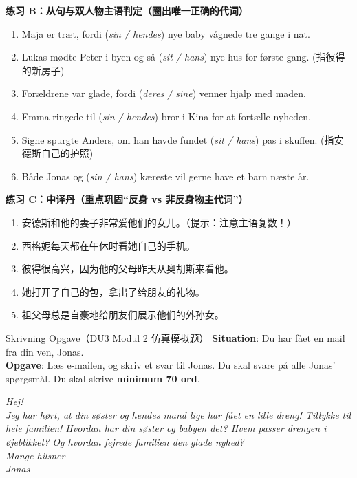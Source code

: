 \textbf{练习 B：从句与双人物主语判定（圈出唯一正确的代词）}
\begin{enumerate}
  \item Maja er træt, fordi (\textit{sin / hendes}) nye baby vågnede tre gange i nat.
  \item Lukas mødte Peter i byen og så (\textit{sit / hans}) nye hus for første gang. (指彼得的新房子)
  \item Forældrene var glade, fordi (\textit{deres / sine}) venner hjalp med maden.
  \item Emma ringede til (\textit{sin / hendes}) bror i Kina for at fortælle nyheden.
  \item Signe spurgte Anders, om han havde fundet (\textit{sit / hans}) pas i skuffen. (指安德斯自己的护照)
  \item Både Jonas og (\textit{sin / hans}) kæreste vil gerne have et barn næste år.
\end{enumerate}

\textbf{练习 C：中译丹（重点巩固“反身 vs 非反身物主代词”）}
\begin{enumerate}
  \item 安德斯和他的妻子非常爱他们的女儿。（提示：注意主语复数！）
  \item 西格妮每天都在午休时看她自己的手机。
  \item 彼得很高兴，因为他的父母昨天从奥胡斯来看他。
  \item 她打开了自己的包，拿出了给朋友的礼物。
  \item 祖父母总是自豪地给朋友们展示他们的外孙女。
\end{enumerate}


\begin{emailbox}{Skrivning Opgave（DU3 Modul 2 仿真模拟题）}
\textbf{Situation}: Du har fået en mail fra din ven, Jonas.\\
\textbf{Opgave}: Læs e-mailen, og skriv et svar til Jonas. Du skal svare på alle Jonas’ spørgsmål. Du skal skrive \textbf{minimum 70 ord}.

\vspace{0.3em}
\textit{Hej!\\
Jeg har hørt, at din søster og hendes mand lige har fået en lille dreng! Tillykke til hele familien! Hvordan har din søster og babyen det? Hvem passer drengen i øjeblikket? Og hvordan fejrede familien den glade nyhed?\\
Mange hilsner\\
Jonas}
\end{emailbox}

